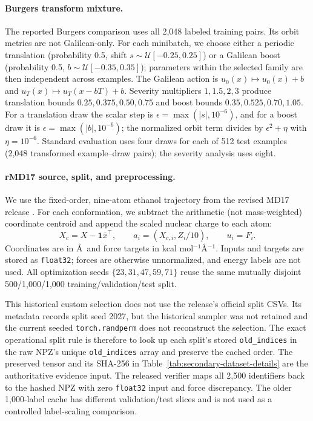 \paragraph{Burgers transform mixture.}
The reported Burgers comparison uses all 2,048 labeled training pairs.  Its orbit
metrics are not Galilean-only.  For each minibatch, we
choose either a periodic translation (probability 0.5, shift
\(s\sim\mathcal U[-0.25,0.25]\)) or a Galilean boost (probability 0.5,
\(b\sim\mathcal U[-0.35,0.35]\)); parameters within the selected family are then
independent across examples.  The Galilean action is
\(u_0(x)\mapsto u_0(x)+b\) and
\(u_T(x)\mapsto u_T(x-bT)+b\).  Severity multipliers
\(1,1.5,2,3\) produce translation bounds
\(0.25,0.375,0.50,0.75\) and boost bounds
\(0.35,0.525,0.70,1.05\).  For a translation draw the scalar step is
\(\epsilon=\max(|s|,10^{-6})\), and for a boost draw it is
\(\epsilon=\max(|b|,10^{-6})\); the normalized orbit term divides by
\(\epsilon^2+\eta\) with \(\eta=10^{-6}\).  Standard evaluation uses four draws
for each of 512 test examples (2,048 transformed example--draw pairs); the severity
analysis uses eight.

\paragraph{rMD17 source, split, and preprocessing.}
We use the fixed-order, nine-atom ethanol trajectory from the revised MD17 release
\citep{christensen2020rmd17,christensen2020rmd17data}.  For each conformation, we
subtract the arithmetic (not mass-weighted) coordinate centroid and append the
scaled nuclear charge to each atom:
\[
X_c=X-\mathbf 1\bar x^\top,\qquad a_i=(X_{c,i},Z_i/10),\qquad u_i=F_i.
\]
Coordinates are in \AA\ and force targets in kcal mol\(^{-1}\)\AA\(^{-1}\).
Inputs and targets are stored as \texttt{float32}; forces are otherwise
unnormalized, and energy labels are not used.  All optimization seeds
\(\{23,31,47,59,71\}\) reuse the same mutually disjoint 500/1,000/1,000
training/validation/test split.

This historical custom selection does not use the release's official split CSVs.
Its metadata records split seed 2027, but the historical sampler was not retained
and the current seeded \texttt{torch.randperm} does not reconstruct the selection.
The exact operational split rule is therefore to look up each split's stored
\texttt{old\_indices} in the raw NPZ's unique \texttt{old\_indices} array and
preserve the cached order.  The preserved tensor and its SHA-256 in
Table~\ref{tab:secondary-dataset-details} are the authoritative evidence input.
The released verifier maps all 2,500 identifiers back to the hashed NPZ with zero
\texttt{float32} input and force discrepancy.  The older 1,000-label cache has
different validation/test slices and is not used as a controlled label-scaling
comparison.

